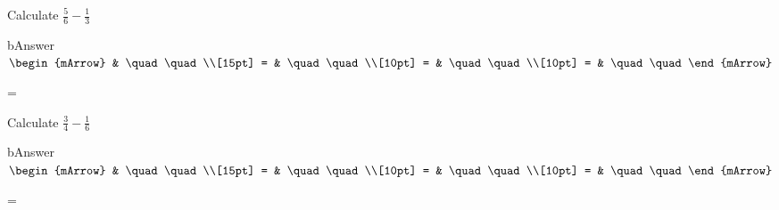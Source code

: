 \begin{mtask}
   \task \begin{exercise} Calculate $ \frac{5}{6} - \frac{1}{3} $
           \begin{envOut}{bAnswer}
             $\begin{mArrow} 
			       & \quad \quad              \\[15pt]
                 = & \quad \quad              \\[10pt]
		   		 = & \quad \quad              \\[10pt]
				 = & \quad \quad 
              \end{mArrow}$
            \begin{shortsolution}  
			     =$ \quad \quad \quad \quad$
			\end{shortsolution}				 
           \end{envOut}
         \end{exercise}
		 

   \task \begin{exercise} Calculate $ \frac{3}{4} - \frac{1}{6} $
           \begin{envOut}{bAnswer}
             $\begin{mArrow} 
			       & \quad \quad              \\[15pt]
                 = & \quad \quad              \\[10pt]
		   		 = & \quad \quad              \\[10pt]
				 = & \quad \quad 
              \end{mArrow}$
            \begin{shortsolution}  
			     =$ \quad \quad \quad \quad$
			\end{shortsolution}				 
           \end{envOut}
         \end{exercise}
		 
			 
\end{mtask}

